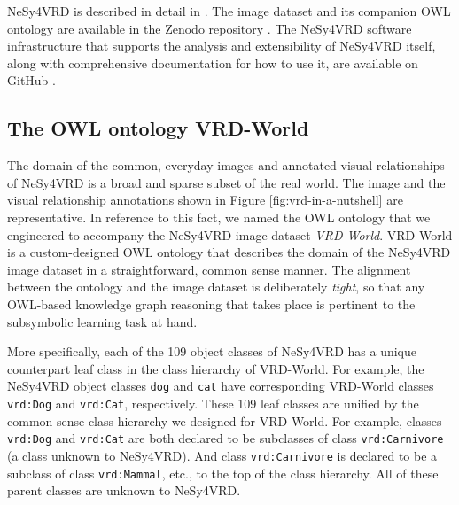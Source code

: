 \documentclass[]{jair}
\begin{document}
NeSy4VRD is described in detail in \citet{Herron/2023/nesy4vrd}.
The image dataset and its companion OWL ontology are available in the Zenodo repository \cite{NeSy4VRD_v11}.
The NeSy4VRD software infrastructure that supports the analysis and extensibility of NeSy4VRD itself, along with comprehensive documentation for how to use it, are available on GitHub \cite{NeSy4VRD_github}.


\subsection{The OWL ontology VRD-World}
The domain of the common, everyday images and annotated visual relationships of NeSy4VRD is a broad and sparse subset of the real world.
The image and the visual relationship annotations shown in Figure \ref{fig:vrd-in-a-nutshell} are representative.
In reference to this fact, we named the OWL ontology that we engineered to accompany the NeSy4VRD image dataset \emph{VRD-World}.
VRD-World is a custom-designed OWL ontology that describes the domain of the NeSy4VRD image dataset in a straightforward, common sense manner.
The alignment between the ontology and the image dataset is deliberately \emph{tight}, so that any OWL-based knowledge graph reasoning that takes place is pertinent to the subsymbolic learning task at hand.

More specifically, each of the 109 object classes of NeSy4VRD has a unique counterpart leaf class in the class hierarchy of VRD-World.
For example, the NeSy4VRD object classes \texttt{dog} and \texttt{cat} have corresponding VRD-World classes \texttt{vrd:Dog} and \texttt{vrd:Cat}, respectively.
These 109 leaf classes are unified by the common sense class hierarchy we designed for VRD-World.
For example, classes \texttt{vrd:Dog} and \texttt{vrd:Cat} are both declared to be subclasses of class \texttt{vrd:Carnivore} (a class unknown to NeSy4VRD).
And class \texttt{vrd:Carnivore} is declared to be a subclass of class \texttt{vrd:Mammal}, etc., to the top of the class hierarchy.
All of these parent classes are unknown to NeSy4VRD.
\end{document}
